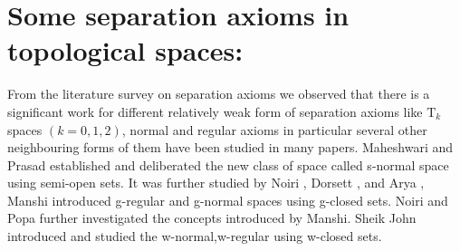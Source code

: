 \section{Some separation axioms in topological spaces:}

From the literature survey on separation axioms we observed that there is a significant work for different relatively weak form of separation axioms like $\mbox{T}_k$ spaces $(k=0, 1, 2)$, normal and regular axioms in particular several other neighbouring forms of them have been studied in many papers.
Maheshwari and Prasad \cite{key64} established and deliberated the new class of space called s-normal space using semi-open sets. It was further studied by Noiri \cite{key85}, Dorsett \cite{key34}, and Arya \cite{key8}, Manshi \cite{key79} introduced g-regular and g-normal spaces using g-closed sets. Noiri and Popa \cite{key90} further investigated the concepts introduced by Manshi. Sheik John\cite{key104} introduced and studied the w-normal,w-regular using w-closed sets.

